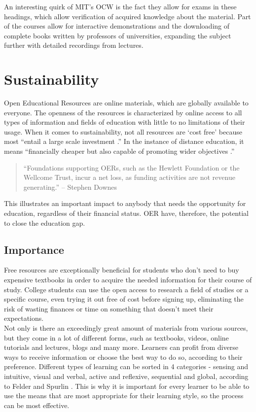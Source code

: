 \documentclass[a4paper]{article}
\begin{document}
\noindent
An interesting quirk of MIT's OCW is the fact they allow for exams in these headings, which allow verification of acquired knowledge about the material. Part of the courses allow for interactive demonstrations and the downloading of complete books written by professors of universities, expanding the subject further with detailed recordings from lectures. 

\section{Sustainability} 

Open Educational Resources are online materials, which are globally available to everyone. The openness of the resources is characterized by online access to all types of information and fields of education with little to no limitations of their usage. When it comes to sustainability, not all resources are `cost free' because most ``entail a large scale investment \cite[p.33]{sustain}.'' In the instance of distance education, it means ``financially cheaper but also capable of promoting wider objectives \cite[p.33]{sustain}.'' \\
\begin{quote}
``Foundations supporting OERs, such as the Hewlett Foundation or the Wellcome Trust, incur a net loss, as funding activities are not revenue generating.'' -- Stephen Downes \\
\end{quote}

\noindent
This illustrates an important impact to anybody that needs the opportunity for education, regardless of their financial status. OER have, therefore, the potential to close the education gap. 

\subsection{Importance} \label{importance}
Free resources are exceptionally beneficial for students who don't need to buy expensive textbooks in order to acquire the needed information for their course of study. College students can use the open access to research a field of studies or a specific course, even trying it out free of cost before signing up, eliminating the risk of wasting finances or time on something that doesn't meet their expectations. \\ 

\noindent
Not only is there an exceedingly great amount of materials from various sources, but they come in a lot of different forms, such as textbooks, videos, online tutorials and lectures, blogs and many more. Learners can profit from diverse ways to receive information or choose the best way to do so, according to their preference. Different types of learning can be sorted in 4 categories - sensing and intuitive, visual and verbal, active and reflexive, sequential and global, according to Felder and Spurlin \cite{learners}. This is why it is important for every learner to be able to use the means that are most appropriate for their learning style, so the process can be most effective. \\
\end{document}
